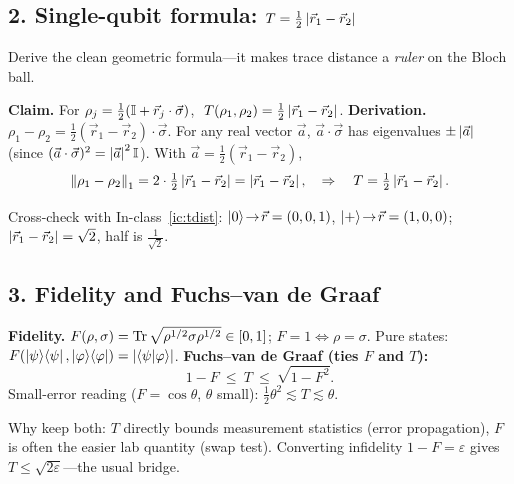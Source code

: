 \documentclass[11pt]{article}
\begin{document}
\subsection*{2. Single-qubit formula: $T=\tfrac12\left\lvert \vec r_1-\vec r_2 \right\rvert$ }
Derive the clean geometric formula---it makes trace distance a \emph{ruler} on the
Bloch ball.

\begin{board}
\textbf{Claim.} For $\rho_j=\tfrac12(\mathbb{I}+\vec r_j\cdot\vec\sigma)$,
$\ T(\rho_1,\rho_2)=\tfrac12\abs{\vec r_1-\vec r_2}$.
\textbf{Derivation.} $\rho_1-\rho_2=\tfrac12(\vec r_1-\vec r_2)\cdot\vec\sigma$.
For any real vector $\vec a$, $\vec a\cdot\vec\sigma$ has eigenvalues $\pm\left\lvert \vec a \right\rvert$
(since $(\vec a\cdot\vec\sigma)^2=\left\lvert \vec a \right\rvert^2\mathbb{I}$). With $\vec a=\tfrac12(\vec r_1-\vec r_2)$,
\[
  \left\lVert \rho_1-\rho_2 \right\rVert_1=2\cdot\tfrac12\left\lvert \vec r_1-\vec r_2 \right\rvert=\left\lvert \vec r_1-\vec r_2 \right\rvert,
  \quad\Rightarrow\quad T=\tfrac12\left\lvert \vec r_1-\vec r_2 \right\rvert.
\]
\end{board}

Cross-check with In-class~\ref{ic:tdist}: $\ket0\!\to\!\vec r=(0,0,1)$,
$\ket+\!\to\!\vec r=(1,0,0)$; $\left\lvert \vec r_1-\vec r_2 \right\rvert=\sqrt2$, half is $\tfrac1{\sqrt2}$. \checkmark


\subsection*{3. Fidelity and Fuchs--van de Graaf }
\begin{board}
\textbf{Fidelity.} $F(\rho,\sigma)=\operatorname{Tr}\sqrt{\rho^{1/2}\sigma\rho^{1/2}}\in[0,1]$;
$F=1\iff\rho=\sigma$. Pure states: $F(\ket{\psi}\!\bra{\psi},\ket{\varphi}\!\bra{\varphi})=\left\lvert \braket{\psi|\varphi} \right\rvert$.
\textbf{Fuchs--van de Graaf (ties $F$ and $T$):}
\[
  1-F\ \le\ T\ \le\ \sqrt{1-F^2}.
\]
Small-error reading ($F=\cos\theta$, $\theta$ small): $\tfrac12\theta^2\lesssim T\lesssim\theta$.
\end{board}

Why keep both: $T$ directly bounds measurement statistics (error propagation), $F$ is
often the easier lab quantity (swap test). Converting infidelity $1-F=\varepsilon$
gives $T\le\sqrt{2\varepsilon}$---the usual bridge.
\end{document}
